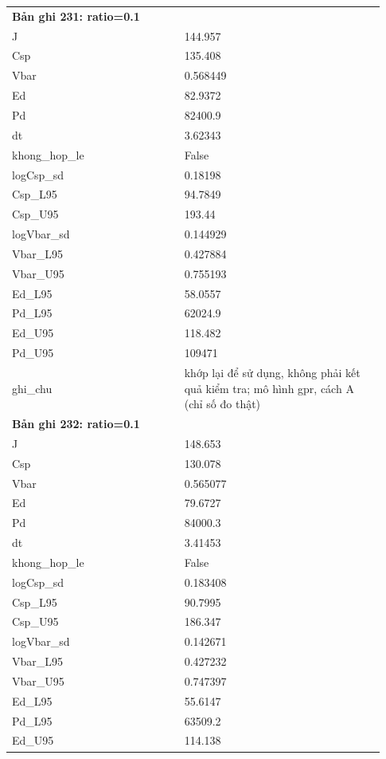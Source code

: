 \begin{longtable}{p{0.43\linewidth}p{0.50\linewidth}}
\midrule
\multicolumn{2}{p{0.95\linewidth}}{\textbf{Bản ghi 231: ratio=0.1}} \\
J & 144.957 \\
Csp & 135.408 \\
Vbar & 0.568449 \\
Ed & 82.9372 \\
Pd & 82400.9 \\
dt & 3.62343 \\
khong\_\allowbreak hop\_\allowbreak le & False \\
logCsp\_\allowbreak sd & 0.18198 \\
Csp\_\allowbreak L95 & 94.7849 \\
Csp\_\allowbreak U95 & 193.44 \\
logVbar\_\allowbreak sd & 0.144929 \\
Vbar\_\allowbreak L95 & 0.427884 \\
Vbar\_\allowbreak U95 & 0.755193 \\
Ed\_\allowbreak L95 & 58.0557 \\
Pd\_\allowbreak L95 & 62024.9 \\
Ed\_\allowbreak U95 & 118.482 \\
Pd\_\allowbreak U95 & 109471 \\
ghi\_\allowbreak chu & khớp lại để sử dụng, không phải kết quả kiểm tra; mô hình gpr, cách A (chỉ số đo thật) \\
\midrule
\multicolumn{2}{p{0.95\linewidth}}{\textbf{Bản ghi 232: ratio=0.1}} \\
J & 148.653 \\
Csp & 130.078 \\
Vbar & 0.565077 \\
Ed & 79.6727 \\
Pd & 84000.3 \\
dt & 3.41453 \\
khong\_\allowbreak hop\_\allowbreak le & False \\
logCsp\_\allowbreak sd & 0.183408 \\
Csp\_\allowbreak L95 & 90.7995 \\
Csp\_\allowbreak U95 & 186.347 \\
logVbar\_\allowbreak sd & 0.142671 \\
Vbar\_\allowbreak L95 & 0.427232 \\
Vbar\_\allowbreak U95 & 0.747397 \\
Ed\_\allowbreak L95 & 55.6147 \\
Pd\_\allowbreak L95 & 63509.2 \\
Ed\_\allowbreak U95 & 114.138 \\

\end{longtable}
